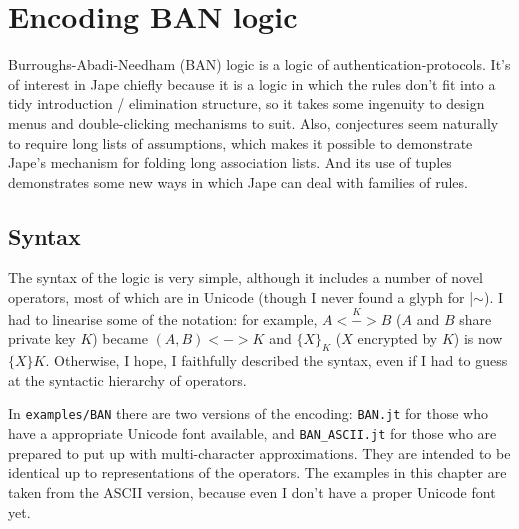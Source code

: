 
\chapter{Encoding BAN logic}
\label{chap:BAN}

Burroughs-Abadi-Needham (BAN) logic is a logic of authentication-protocols. It's of interest in Jape chiefly because it is a logic in which the rules don't fit into a tidy introduction / elimination structure, so it takes some ingenuity to design menus and double-clicking mechanisms to suit. Also, conjectures seem naturally to require long lists of assumptions, which makes it possible to demonstrate Jape's mechanism for folding long association lists. And its use of tuples demonstrates some new ways in which Jape can deal with families of rules.

\section{Syntax}

The syntax of the logic is very simple, although it includes a number of novel operators, most of which are in Unicode (though I never found a glyph for |$\sim$). I had to linearise some of the notation: for example, $A\overset{K}{<->}B$ ($A$ and $B$ share private key $K$) became $( A,B)<->K$ and $\{ X\}_{K}$ ($X$ encrypted by $K$) is now $\{X\}K$. Otherwise, I hope, I faithfully described the syntax, even if I had to guess at the syntactic hierarchy of operators.

In \texttt{examples/BAN} there are two versions of the encoding: \texttt{BAN.jt} for those who have a appropriate Unicode font available, and \texttt{BAN\_ASCII.jt} for those who are prepared to put up with multi-character approximations. They are intended to be identical up to representations of the operators. The examples in this chapter are taken from the ASCII version, because even I don't have a proper Unicode font yet.

